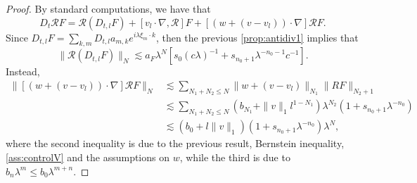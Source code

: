 \documentclass[10pt,a4paper]{amsart}
\numberwithin{equation}{section}
\numberwithin{corollario}{section}
\numberwithin{lemma}{section}
\numberwithin{prop}{section}
\theoremstyle{definition}
\theoremstyle{remark}
\begin{document}
\begin{proof}
By standard computations, we have that
\begin{equation}
    D_t\mathcal{R}F=\mathcal{R}(D_{t,l}F)+[v_l\cdot \nabla, \mathcal{R}]F+[(w+(v-v_l))\cdot \nabla]\mathcal{R}F.
\end{equation}
Since $D_{t,l}F=\sum_{k,m}D_{t,l}a_{m,k}e^{i\lambda\xi_m \cdot k}$, then the previous \autoref{prop:antidiv1} implies that
\begin{equation}\label{est:DRF1}
    \|\mathcal{R}(D_{t,l}F)\|_N\lesssim a_F\lambda ^N[s_0(c\lambda)^{-1}+s_{n_0+1}\lambda^{-n_0-1}c^{-1}].
\end{equation}
Instead,
\begin{align}\label{est:DRF2}
    \|[(w+(v-v_l))\cdot \nabla]\mathcal{R}F\|_N&\lesssim \sum_{N_1+N_2\le N}\|w+(v-v_l)\|_{N_1}\|RF\|_{N_2+1}\\
    &\lesssim \sum_{N_1+N_2\le N} (b_{N_1}+\|v\|_1 l^{1-N_1})\lambda^{N_2}(1+s_{n_0+1}\lambda^{-n_0})\\
    &\lesssim (b_0+l\|v\|_1)(1+s_{n_0+1}\lambda^{-n_0})\lambda^N,
\end{align}
where the second inequality is due to the previous result, Bernstein inequality, \eqref{ass:controlV} and the assumptions on $w$, while the third is due to $b_n\lambda^m\le b_0\lambda^{m+n}$.


\end{proof}
\end{document}
